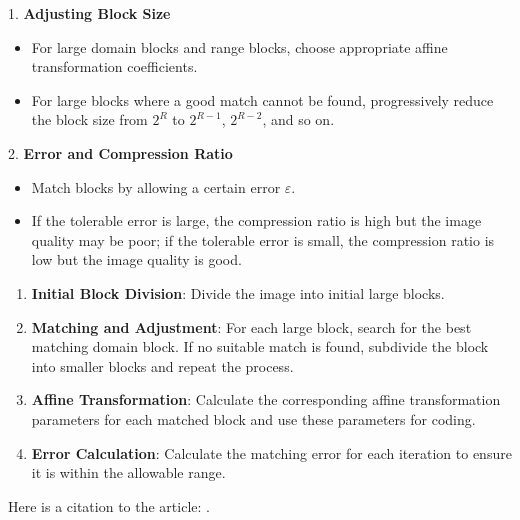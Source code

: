 \documentclass{article}
\begin{document}
1. \textbf{Adjusting Block Size}
   \begin{itemize}
       \item For large domain blocks and range blocks, choose appropriate affine transformation coefficients.
       \item For large blocks where a good match cannot be found, progressively reduce the block size from \( 2^R \) to \( 2^{R-1} \), \( 2^{R-2} \), and so on.
   \end{itemize}

2. \textbf{Error and Compression Ratio}
   \begin{itemize}
       \item Match blocks by allowing a certain error \( \varepsilon \).
       \item If the tolerable error is large, the compression ratio is high but the image quality may be poor; if the tolerable error is small, the compression ratio is low but the image quality is good.
   \end{itemize}

\begin{enumerate}
    \item \textbf{Initial Block Division}: Divide the image into initial large blocks.
    \item \textbf{Matching and Adjustment}: For each large block, search for the best matching domain block. If no suitable match is found, subdivide the block into smaller blocks and repeat the process.
    \item \textbf{Affine Transformation}: Calculate the corresponding affine transformation parameters for each matched block and use these parameters for coding.
    \item \textbf{Error Calculation}: Calculate the matching error for each iteration to ensure it is within the allowable range.
\end{enumerate}

Here is a citation to the article: \cite{may1996fractal}.
\nocite{*}


\end{document}
